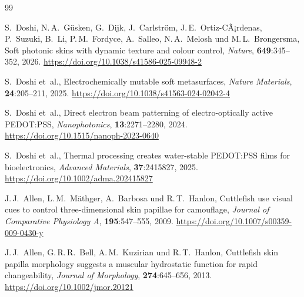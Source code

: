 ﻿\documentclass[a4paper,12pt]{article}
\theoremstyle{definition}
\begin{document}
	\begin{thebibliography}{99}
		
		
		S.~Doshi, N.\,A.~Güsken, G.~Dijk, J.~Carlström, J.\,E.~Ortiz-CÃ¡rdenas,
		P.~Suzuki, B.~Li, P.\,M.~Fordyce, A.~Salleo, N.\,A.~Melosh und
		M.\,L.~Brongersma,
		\newblock Soft photonic skins with dynamic texture and colour control,
		\newblock \emph{Nature}, \textbf{649}:345--352, 2026.
		\newblock \url{https://doi.org/10.1038/s41586-025-09948-2}
		
		
		S.~Doshi et~al.,
		\newblock Electrochemically mutable soft metasurfaces,
		\newblock \emph{Nature Materials}, \textbf{24}:205--211, 2025.
		\newblock \url{https://doi.org/10.1038/s41563-024-02042-4}
		
		S.~Doshi et~al.,
		\newblock Direct electron beam patterning of electro-optically active
		{PEDOT:PSS},
		\newblock \emph{Nanophotonics}, \textbf{13}:2271--2280, 2024.
		\newblock \url{https://doi.org/10.1515/nanoph-2023-0640}
		
		S.~Doshi et~al.,
		\newblock Thermal processing creates water-stable {PEDOT:PSS} films for
		bioelectronics,
		\newblock \emph{Advanced Materials}, \textbf{37}:2415827, 2025.
		\newblock \url{https://doi.org/10.1002/adma.202415827}
		
		
		J.\,J.~Allen, L.\,M.~Mäthger, A.~Barbosa und R.\,T.~Hanlon,
		\newblock Cuttlefish use visual cues to control three-dimensional skin papillae
		for camouflage,
		\newblock \emph{Journal of Comparative Physiology A}, \textbf{195}:547--555,
		2009.
		\newblock \url{https://doi.org/10.1007/s00359-009-0430-y}
		
		J.\,J.~Allen, G.\,R.\,R.~Bell, A.\,M.~Kuzirian und R.\,T.~Hanlon,
		\newblock Cuttlefish skin papilla morphology suggests a muscular hydrostatic
		function for rapid changeability,
		\newblock \emph{Journal of Morphology}, \textbf{274}:645--656, 2013.
		\newblock \url{https://doi.org/10.1002/jmor.20121}
		

\end{thebibliography}
\end{document}
